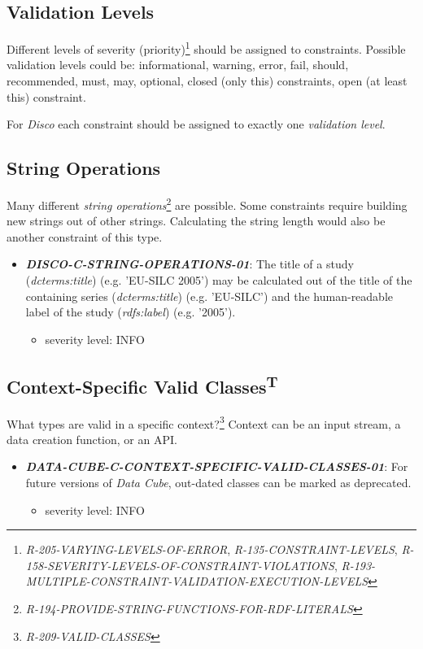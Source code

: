 \documentclass{llncs}
\begin{document}
\subsection{Validation Levels}

Different levels of severity (priority)\footnote{\emph{R-205-VARYING-LEVELS-OF-ERROR}, \emph{R-135-CONSTRAINT-LEVELS}, \emph{R-158-SEVERITY-LEVELS-OF-CONSTRAINT-VIOLATIONS}, \emph{R-193-MULTIPLE-CONSTRAINT-VALIDATION-EXECUTION-LEVELS}} should be assigned to constraints.
Possible validation levels could be: informational, warning, error, fail, should, recommended, must, may, optional, closed (only this) constraints, open (at least this) constraint.

For \emph{Disco} each constraint should be assigned to exactly one \emph{validation level}.

\subsection{String Operations}

Many different \emph{string operations}\footnote{\emph{R-194-PROVIDE-STRING-FUNCTIONS-FOR-RDF-LITERALS}} are possible.
Some constraints require building new strings out of other strings.
Calculating the string length would also be another constraint of this type.

\begin{itemize}
	\item \textbf{{\em DISCO-C-STRING-OPERATIONS-01}}: The title of a study (\emph{dcterms:title}) (e.g. 'EU-SILC 2005') may be calculated out of the title of the containing series (\emph{dcterms:title}) (e.g. 'EU-SILC') and the human-readable label of the study (\emph{rdfs:label}) (e.g. '2005').   
	\begin{itemize}
		\item severity level: INFO
	\end{itemize}
\end{itemize}

\subsection{Context-Specific Valid Classes\textsuperscript{T}}

What types are valid in a specific context?\footnote{\emph{R-209-VALID-CLASSES}} 
Context can be an input stream, a data creation function, or an API.

\begin{itemize}
	\item \textbf{{\em DATA-CUBE-C-CONTEXT-SPECIFIC-VALID-CLASSES-01}}: For future versions of \emph{Data Cube}, out-dated classes can be marked as deprecated.
	\begin{itemize}
		\item severity level: INFO
	\end{itemize}
\end{itemize}
\end{document}

